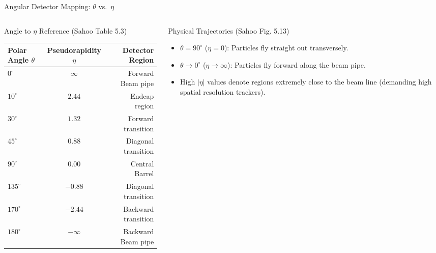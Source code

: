 \documentclass[aspectratio=169]{beamer}
\begin{document}
\begin{frame}{Angular Detector Mapping: $\theta$ vs.\ $\eta$}
    \begin{columns}
        \begin{column}{0.48\textwidth}
            \begin{block}{Angle to $\eta$ Reference (Sahoo Table 5.3)}
                \tiny
                \begin{tabular}{lcr}
                    \toprule
                    \textbf{Polar Angle $\theta$} & \textbf{Pseudorapidity $\eta$} & \textbf{Detector Region} \\
                    \midrule
                    $0^\circ$ & $\infty$ & Forward Beam pipe \\
                    $10^\circ$ & $2.44$ & Endcap region \\
                    $30^\circ$ & $1.32$ & Forward transition \\
                    $45^\circ$ & $0.88$ & Diagonal transition \\
                    $90^\circ$ & $0.00$ & Central Barrel \\
                    $135^\circ$ & $-0.88$ & Diagonal transition \\
                    $170^\circ$ & $-2.44$ & Backward transition \\
                    $180^\circ$ & $-\infty$ & Backward Beam pipe \\
                    \bottomrule
                \end{tabular}
            \end{block}
        \end{column}
        \begin{column}{0.52\textwidth}
            \begin{block}{Physical Trajectories (Sahoo Fig. 5.13)}
                \footnotesize
                \begin{itemize}
                    \item $\theta = 90^\circ$ ($\eta=0$): Particles fly straight out transversely.
                    \item $\theta \to 0^\circ$ ($\eta \to \infty$): Particles fly forward along the beam pipe.
                    \item High $|\eta|$ values denote regions extremely close to the beam line (demanding high spatial resolution trackers).
                \end{itemize}

\end{block}
\end{column}
\end{columns}
\end{frame}
\end{document}
